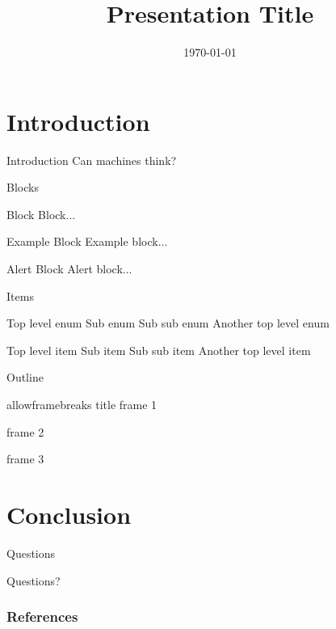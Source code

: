 \documentclass{beamer}
\title[Presentation]{Presentation Title}
\author[Dogan]
{%
  \texorpdfstring{
    \begin{columns}
      \column{.45\linewidth}
      \centering
      Haluk Dogan\\
      \url{https://haluk.github.io/}\\
      \href{mailto:hlk.dogan@gmail.com}{hlk.dogan@gmail.com}
    \end{columns}
}
{Dogan}
}
\institute[UNL] %
{
  Department of Computer Science\\
  University of Nebraska-Lincoln
}
\date[\today] %
{\today}
\newcounter{cont}
\begin{document}
\begin{frame}
  \titlepage
\end{frame}

\section{Introduction}
\begin{frame}{Introduction}
  Can machines think? \citep{turin1950imitation}
\end{frame}

\begin{frame}{Blocks}
  \begin{block}{Block}
    Block...
  \end{block}
  \begin{exampleblock}{Example Block}
    Example block...
  \end{exampleblock}
  \begin{alertblock}{Alert Block}
    Alert block...
  \end{alertblock}
\end{frame}

\begin{frame}{Items}
  \begin{outline}[enumerate]
    \1 Top level enum
    \2 Sub enum
    \3 Sub sub enum
    \1 Another top level enum
  \end{outline}

  \begin{outline}[itemize]
    \1 Top level item
    \2 Sub item
    \3 Sub sub item
    \1 Another top level item
  \end{outline}

\end{frame}

\begin{frame}{Outline}
  \tableofcontents
\end{frame}

\begin{frame}[allowframebreaks]{allowframebreaks title}
    frame 1
    \framebreak

    frame 2
    \framebreak

    frame 3
    \framebreak
\end{frame}

\section{Conclusion}
\begin{frame}{Questions}
  \begin{center}
    \Huge{Questions?}
  \end{center}
\end{frame}
\begin{frame}[allowframebreaks]
        \frametitle{References}
        
        
\end{frame}
\end{document}
